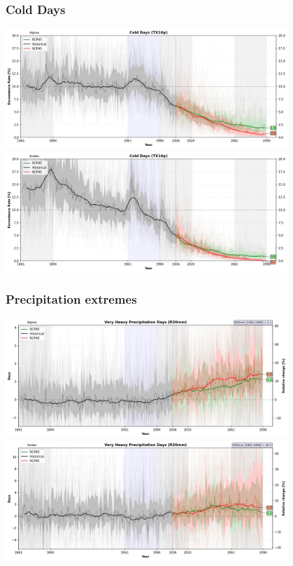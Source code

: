 
\begin{frame}
\frametitle{Cold Days}
\begin{center}

{\includegraphics[width=0.8\textwidth]{risultati/tx10p_Alpine_Models_ts_lim_20}}
{\includegraphics[width=0.8\textwidth]{risultati/tx10p_Andes_Models_ts_lim_20}}
\end{center}
\end{frame}


\begin{frame}
\frametitle{Precipitation extremes}
\begin{center}

{\includegraphics[width=0.8\textwidth]{risultati/r20mm_Alpine_Models_ts}}
{\includegraphics[width=0.8\textwidth]{risultati/r20mm_Andes_Models_ts}}
\end{center}
\end{frame}

